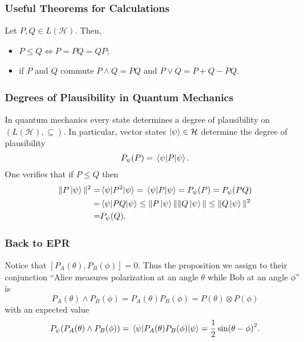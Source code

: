 \documentclass{beamer}
\begin{document}
\begin{frame}

	\frametitle{Useful Theorems for Calculations}
	
	\begin{theorem}
		
		Let $P,Q\in L(\mathcal{H})$. Then,
		\begin{itemize}
			\item $P\leq Q\Leftrightarrow P=PQ=QP$;
			\item if $P$ and $Q$ commute $P\wedge Q=PQ$ and $P\vee Q=P+Q-PQ$.		
		\end{itemize}
		
	\end{theorem}

\end{frame}

\begin{frame}

	\frametitle{Degrees of Plausibility in Quantum Mechanics}
	
	In quantum mechanics every state determines a degree of plausibility on $(L(\mathcal{H}),\subseteq)$. In particular, vector states $\ket{\psi}\in\mathcal{H}$ determine the degree of plausibility
	\begin{equation}
		P_\psi(P)=\ev{P}{\psi}.
	\end{equation}
	One verifies that if $P\leq Q$ then
	\begin{align}
	\begin{split}
		\|P\ket{\psi}\|^2=&\ev{P^2}{\psi}=\ev{P}{\psi}=P_\psi(P)=P_\psi(PQ)\\
		=&\ev{PQ}{\psi}\leq\|P\ket{\psi}\|\|Q\ket{\psi}\|\leq\|Q\ket{\psi}\|^2\\
		=&P_\psi(Q).
	\end{split}
	\end{align}

\end{frame}

\begin{frame}

	\frametitle{Back to EPR}
	
	Notice that $[P_A(\theta),P_B(\phi)]=0$. Thus the proposition we assign to their conjunction ``Alice measures polarization at an angle $\theta$ while Bob at an angle $\phi$'' is 
	\begin{equation}
		P_A(\theta)\wedge P_B(\phi)=P_A(\theta)P_B(\phi)=P(\theta)\otimes P(\phi)
	\end{equation}
	with an expected value
	\begin{equation}
		P_\psi(P_A(\theta)\wedge P_B(\phi))=\ev{P_A(\theta)P_B(\phi)}{\psi}=\frac{1}{2}\sin(\theta-\phi)^2.
	\end{equation}
	
\end{frame}
\end{document}
